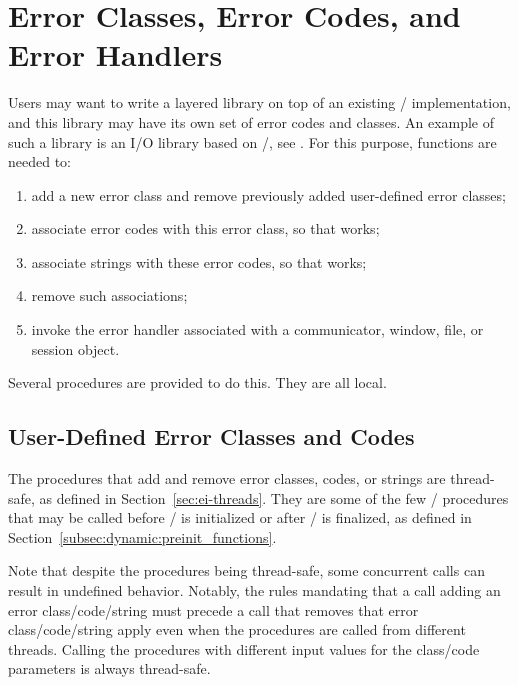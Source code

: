 \section{Error Classes, Error Codes, and Error Handlers} 
\label{sec:ei-error}

Users may want to write a layered library on top of an existing \MPI/
implementation, and this library may have its own set of error codes
and classes. An example of such a library is an I/O library based on
\MPI/, see .
For this purpose, functions are needed to:
\begin{enumerate}
\item add a new error class and remove previously added user-defined error classes;
\item associate error codes with this error class, so that  works;
\item associate strings with these error codes, so that  works;
\item remove such associations;
\item invoke the error handler associated with a communicator, window, file, or session object.
\end{enumerate}

\noindent
Several procedures are provided to do this.  They are all local.

\subsection{User-Defined Error Classes and Codes}

The procedures that add and remove error classes, codes, or strings are thread-safe,
as defined in Section~\ref{sec:ei-threads}.
They are some of the few \MPI/ procedures that may be called before \MPI/ is
initialized or after \MPI/ is finalized, as defined in Section~\ref{subsec:dynamic:preinit_functions}.

\begin{users}
Note that despite the procedures being thread-safe, some concurrent calls can result
in undefined behavior. Notably, the rules mandating that a call adding an error
class/code/string must precede a call that removes that error class/code/string apply even
when the procedures are called from different threads. Calling the procedures with different
input values for the class/code parameters is always thread-safe.
\end{users}


